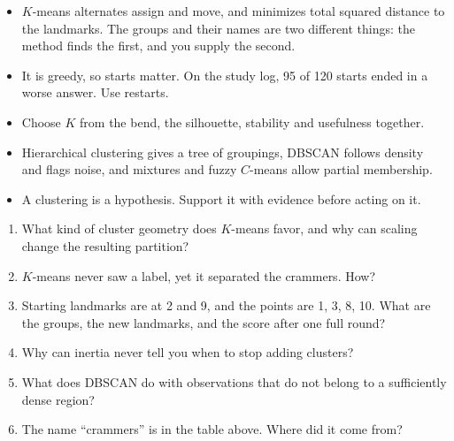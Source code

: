\begin{chapterrecap}
\begin{itemize}
  \item $K$-means alternates assign and move, and minimizes total squared distance to the landmarks. The groups and their names are two different things: the method finds the first, and you supply the second.
  \item It is greedy, so starts matter. On the study log, 95 of 120 starts ended in a worse answer. Use restarts.
  \item Choose $K$ from the bend, the silhouette, stability and usefulness together.
  \item Hierarchical clustering gives a tree of groupings, DBSCAN follows density and flags noise, and mixtures and fuzzy $C$-means allow partial membership.
  \item A clustering is a hypothesis. Support it with evidence before acting on it.
\end{itemize}
\end{chapterrecap}

\begin{quickcheck}
\begin{enumerate}
  \item What kind of cluster geometry does $K$-means favor, and why can scaling change the resulting partition?
  \item $K$-means never saw a label, yet it separated the crammers. How?
  \item Starting landmarks are at 2 and 9, and the points are 1, 3, 8, 10. What are the groups, the new landmarks, and the score after one full round?
  \item Why can inertia never tell you when to stop adding clusters?
  \item What does DBSCAN do with observations that do not belong to a sufficiently dense region?
  \item The name ``crammers'' is in the table above. Where did it come from?
\end{enumerate}
\end{quickcheck}
